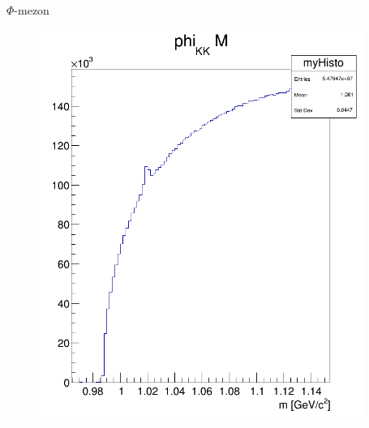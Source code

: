 \documentclass[10pt]{beamer}
\begin{document}
\begin{frame}[t]{$\Phi$-mezon}
\begin{minipage}{\textwidth}
\begin{minipage}{0.48\textwidth}
\begin{figure}[H!]
\centering
\includegraphics[width=0.94\textwidth]{../latex/phi_KK_Mzoom.png}
\end{figure}
\end{minipage}
\begin{minipage}{0.45\textwidth}
\centering

\end{minipage}
\end{minipage}
\end{frame}
\end{document}
